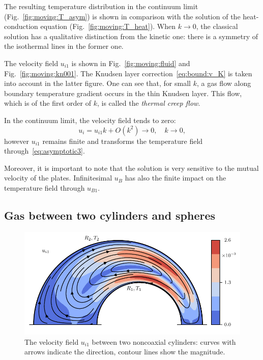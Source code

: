 \documentclass[smallextended, referee]{svjour3} %
\begin{document}
The resulting temperature distribution in the continuum limit (Fig.~\ref{fig:moving:T_asym}) is shown
in comparison with the solution of the heat-conduction equation (Fig.~\ref{fig:moving:T_heat}).
When \(k\to0\), the classical solution has a qualitative distinction from the kinetic one:
there is a symmetry of the isothermal lines in the former one.

The velocity field \(u_{i1}\) is shown in Fig.~\ref{fig:moving:fluid} and Fig.~\ref{fig:moving:kn001}.
The Knudsen layer correction~\eqref{eq:bound:v_K} is taken into account in the latter figure.
One can see that, for small \(k\), a gas flow along boundary temperature gradient occurs
in the thin Knudsen layer. This flow, which is of the first order of \(k\), is called
the \emph{thermal creep flow}.

In the continuum limit, the velocity field tends to zero:
\[ u_i = u_{i1}k + O(k^2) \to 0, \quad k\to0, \]
however \(u_{i1}\) remains finite and transforms the temperature field through~\eqref{eq:asymptotic3}.

Moreover, it is important to note that the solution is very sensitive to the mutual velocity of the plates.
Infinitesimal \(u_B\) has also the finite impact on the temperature field through \(u_{B1}\).

\subsection{Gas between two cylinders and spheres}

\begin{figure}
	\centering
	\includegraphics{Fig7}
	\caption{The velocity field \(u_{i1}\) between two noncoaxial cylinders:
		curves with arrows indicate the direction, contour lines show the magnitude.}
	\label{fig:cylinders}
\end{figure}
\end{document}
